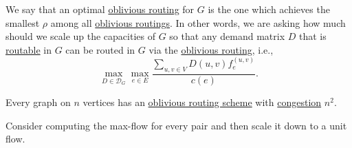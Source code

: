 We say that an optimal \hyperref[def:oblivious-routing-scheme]{oblivious routing} for \(G\) is the one which achieves the smallest \(\rho \) among all \hyperref[def:oblivious-routing-scheme]{oblivious routings}. In other words, we are asking how much should we scale up the capacities of \(G\) so that any demand matrix \(D\) that is \hyperref[def:routable]{routable} in \(G\) can be routed in \(G\) via the \hyperref[def:oblivious-routing-scheme]{oblivious routing}, i.e.,
\[
	\max _{D \in \mathcal{D} _G} \max _{e \in E} \frac{\sum_{u, v \in V} D(u, v) f_e^{(u, v)}}{c(e)}.
\]

\begin{claim}
	Every graph on \(n\) vertices has an \hyperref[prb:oblivious-routing]{oblivious routing scheme} with \hyperref[def:congestion-of-oblivious-routing]{congestion} \(n^2\).
\end{claim}
\begin{explanation}
	Consider computing the max-flow for every pair and then scale it down to a unit flow.
\end{explanation}

